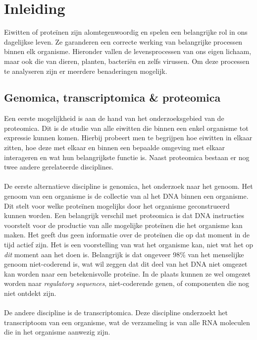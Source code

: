 \chapter{Inleiding}\label{ch:introductie}

Eiwitten of proteïnen zijn alomtegenwoordig en spelen een belangrijke rol in ons dagelijkse leven.
Ze garanderen een correcte werking van belangrijke processen binnen elk organisme.
Hieronder vallen de levensprocessen van ons eigen lichaam, maar ook die van dieren, planten, bacteriën en zelfs virussen.
Om deze processen te analyseren zijn er meerdere benaderingen mogelijk.

\section{Genomica, transcriptomica \& proteomica}\label{sec:genomica-transcriptomica-&-proteomica}
Een eerste mogelijkheid is aan de hand van het onderzoeksgebied van de proteomica.
Dit is de studie van alle eiwitten die binnen een enkel organisme tot expressie kunnen komen.
Hierbij probeert men te begrijpen hoe eiwitten in elkaar zitten, hoe deze met elkaar en binnen een bepaalde omgeving met elkaar interageren en wat hun belangrijkste functie is.
Naast proteomica bestaan er nog twee andere gerelateerde disciplines.
\\ \\
De eerste alternatieve discipline is genomica, het onderzoek naar het genoom.
Het genoom van een organisme is de collectie van al het DNA binnen een organisme.
Dit stelt voor welke proteïnen mogelijks door het organisme geconstrueerd kunnen worden.
Een belangrijk verschil met proteomica is dat DNA instructies voorstelt voor de productie van alle mogelijke proteïnen die het organisme kan maken.
Het geeft dus geen informatie over de proteïnen die op dat moment in de tijd actief zijn.
Het is een voorstelling van wat het organisme kan, niet wat het op \textit{dit} moment aan het doen is.
Belangrijk is dat ongeveer 98\% van het menselijke genoom niet-coderend is, wat wil zeggen dat dit deel van het DNA niet omgezet kan worden naar een betekenisvolle proteïne.
In de plaats kunnen ze wel omgezet worden naar \textit{regulatory sequences}, niet-coderende genen, of componenten die nog niet ontdekt zijn.
\\ \\
De andere discipline is de transcriptomica.
Deze discipline onderzoekt het transcriptoom van een organisme, wat de verzameling is van alle RNA moleculen die in het organisme aanwezig zijn.
